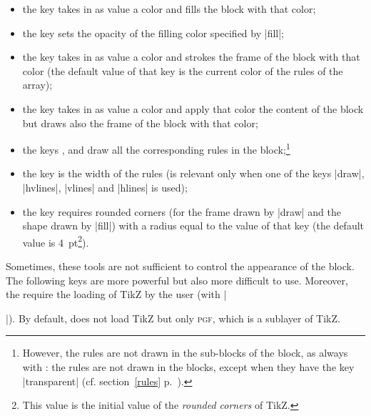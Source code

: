 \documentclass[dvipsnames]{article}%
\begin{document}
\begin{itemize}
\item {}
the key  takes in as value a color and fills the block
with that color;
\item {} 
the key  sets the opacity of the filling color specified by
|fill|; 
\item {}
the key  takes in as value a color and strokes the
frame of the block with that color (the default value of that key is the
current color of the rules of the array);
\item {} 
the key  takes in as value a color and apply that
color the content of the block but draws also the frame of the block with that
color;
\item {} 
the keys ,  and
 draw all the corresponding rules in the
block;\footnote{However, the rules are not drawn in the sub-blocks of the
block, as always with : the rules are not drawn in the blocks,
except when they have the key |transparent|
(cf. section~\ref{rules} p.~\pageref{rules}).}
\item {}
the key  is the width of the rules (is relevant
only when one of the keys |draw|, |hvlines|, |vlines| and |hlines| is used);
\item {}
the key  requires rounded corners (for the
frame drawn by |draw| and the shape drawn by |fill|) with a radius equal to
the value of that key (the default value is 4~pt\footnote{This value is the
initial value of the \emph{rounded corners} of TikZ.}).
\end{itemize}

\medskip
Sometimes, these tools are not sufficient to control the appearance of the
block. The following keys are more powerful but also more difficult to use.
Moreover, the require the loading of TikZ by the user (with
|\usepackage{tikz}|). By default,  does not load TikZ but only
\textsc{pgf}, which is a sublayer of TikZ.
\end{document}
